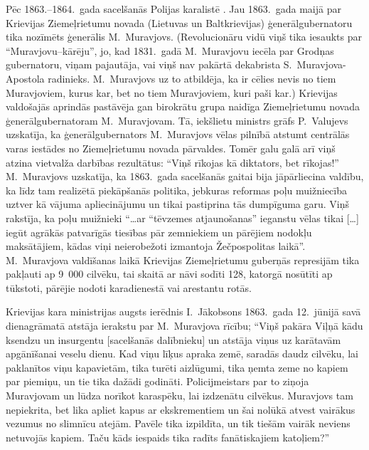 \documentclass[twoside,a5paper,12pt,fleqn,openany]{extbook}
\newcommand{\citespace}{[\dots{}]}
\begin{document}
Pēc 1863.--1864.~gada sacelšanās Polijas karalistē . Jau 1863.~gada maijā par Krievijas Ziemeļrietumu novada (Lietuvas un Baltkrievijas) ģenerālgubernatoru tika nozīmēts ģenerālis M.~Muravjovs. (Revolucionāru vidū viņš tika iesaukts par ``Muravjovu--kārēju'', jo, kad 1831.~gadā M.~Muravjovu iecēla par Grodņas gubernatoru, viņam pajautāja, vai viņš nav pakārtā dekabrista S.~Muravjova-Apostola radinieks. M.~Muravjovs uz to atbildēja, ka ir cēlies nevis no tiem Muravjoviem, kurus kar, bet no tiem Muravjoviem, kuri paši kar.) Krievijas valdošajās aprindās pastāvēja gan birokrātu grupa naidīga Ziemeļrietumu novada ģenerālgubernatoram M.~Muravjovam. Tā, iekšlietu ministrs grāfs P.~Valujevs uzskatīja, ka ģenerālgubernators M.~Muravjovs vēlas pilnībā atstumt centrālās varas iestādes no Ziemeļrietumu novada pārvaldes. Tomēr galu galā arī viņš atzina vietvalža darbības rezultātus: ``Viņš rīkojas kā diktators, bet rīkojas!'' M.~Muravjovs uzskatīja, ka 1863.~gada sacelšanās gaitai bija jāpārliecina valdību, ka līdz tam realizētā piekāpšanās politika, jebkuras reformas poļu muižniecība uztver kā vājuma apliecinājumu un tikai pastiprina tās dumpīguma garu. Viņš rakstīja, ka poļu muižnieki ``\dots{}ar ``tēvzemes atjaunošanas'' ieganstu vēlas tikai \citespace{} iegūt agrākās patvarīgās tiesības pār zemniekiem un pārējiem nodokļu maksātājiem, kādas viņi neierobežoti izmantoja Žečpospolitas laikā''. M.~Muravjova valdīšanas laikā Krievijas Ziemeļrietumu guberņās represijām tika pakļauti ap 9~000 cilvēku, tai skaitā ar nāvi sodīti 128, katorgā nosūtīti ap tūkstoti, pārējie nodoti karadienestā vai arestantu rotās.

Krievijas kara ministrijas augsts ierēdnis I.~Jākobsons 1863.~gada 12.~jūnijā savā dienagrāmatā atstāja ierakstu par M.~Muravjova rīcību; ``Viņš pakāra Viļņā kādu ksendzu un insurgentu [sacelšanās dalībnieku] un atstāja viņus uz karātavām apgānīšanai veselu dienu. Kad viņu līķus apraka zemē, saradās daudz cilvēku, lai paklanītos viņu kapavietām, tika turēti aizlūgumi, tika ņemta zeme no kapiem par piemiņu, un tie tika dažādi godināti. Policijmeistars par to ziņoja Muravjovam un lūdza norīkot karaspēku, lai izdzenātu cilvēkus. Muravjovs tam nepiekrita, bet lika apliet kapus ar ekskrementiem un šai nolūkā atvest vairākus vezumus no slimnīcu atejām. Pavēle tika izpildīta, un tik tiešām vairāk neviens netuvojās kapiem. Taču kāds iespaids tika radīts fanātiskajiem katoļiem?''
\end{document}
